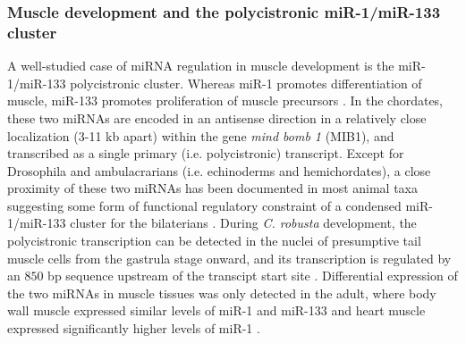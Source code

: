 \documentclass[graybox]{svmult}
\begin{document}
\subsubsection{Muscle development and the polycistronic miR-1/miR-133 cluster}
A well-studied case of miRNA regulation in muscle development is the 
miR-1/miR-133 polycistronic cluster. Whereas miR-1 promotes differentiation of 
muscle, miR-133 promotes proliferation of muscle precursors \cite{Chen:2005yq}. 
In the chordates, these two miRNAs are encoded in an antisense direction in a 
relatively close localization (3-11 kb apart) within the gene \textit{mind bomb 
1} (MIB1), and transcribed as a single primary (i.e. polycistronic) transcript. 
Except for Drosophila and ambulacrarians (i.e. echinoderms and hemichordates), a 
close proximity of these two miRNAs has been documented in most animal taxa 
suggesting some form of functional regulatory constraint of a condensed 
miR-1/miR-133 cluster for the bilaterians \cite{Campo-Paysaa:2011}. 
During \textit{C. robusta} development, the polycistronic transcription can be 
detected in the nuclei of presumptive tail muscle cells from the gastrula stage 
onward, and its transcription is regulated by an $850$ bp sequence upstream of 
the transcipt start site \cite{Kusakabe2013}. Differential 
expression of the two miRNAs in muscle tissues was only detected in the adult, 
where body wall muscle expressed similar levels of miR-1 and miR-133 and heart 
muscle expressed significantly higher levels of miR-1 \cite{Kusakabe2013}.
\end{document}
